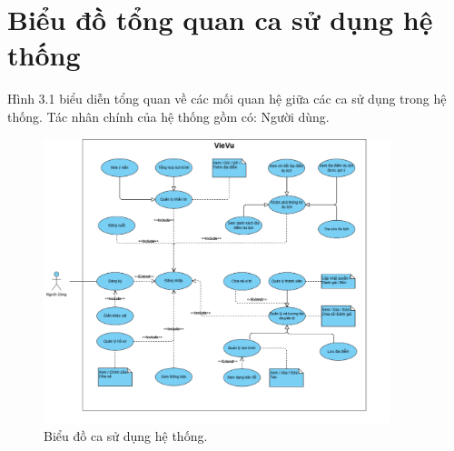 \section{Biểu đồ tổng quan ca sử dụng hệ thống}
Hình 3.1 biểu diễn tổng quan về các mối quan hệ giữa các ca sử dụng trong hệ
thống. Tác nhân chính của hệ thống gồm có: Người dùng.
\begin{figure}[H]
    \centering
    \includegraphics[width=0.9\textwidth]{figures/c3/3-2-usecases.png}
    \caption{Biểu đồ ca sử dụng hệ thống.}
    \label{fig:3-2-usecases}
\end{figure}
